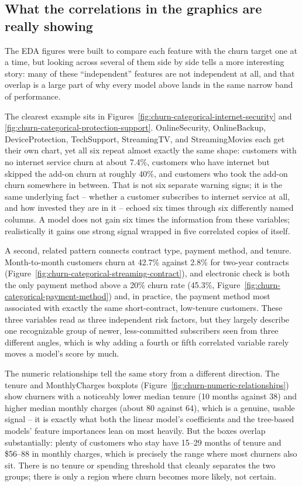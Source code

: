\documentclass{article}
\begin{document}
\subsection{What the correlations in the graphics are really showing}
The EDA figures were built to compare each feature with the churn target one at a time, but looking across several of them side by side tells a more interesting story: many of these ``independent'' features are not independent at all, and that overlap is a large part of why every model above lands in the same narrow band of performance.

The clearest example sits in Figures~\ref{fig:churn-categorical-internet-security} and \ref{fig:churn-categorical-protection-support}. OnlineSecurity, OnlineBackup, DeviceProtection, TechSupport, StreamingTV, and StreamingMovies each get their own chart, yet all six repeat almost exactly the same shape: customers with no internet service churn at about 7.4\%, customers who have internet but skipped the add-on churn at roughly 40\%, and customers who took the add-on churn somewhere in between. That is not six separate warning signs; it is the same underlying fact -- whether a customer subscribes to internet service at all, and how invested they are in it -- echoed six times through six differently named columns. A model does not gain six times the information from these variables; realistically it gains one strong signal wrapped in five correlated copies of itself.

A second, related pattern connects contract type, payment method, and tenure. Month-to-month customers churn at 42.7\% against 2.8\% for two-year contracts (Figure~\ref{fig:churn-categorical-streaming-contract}), and electronic check is both the only payment method above a 20\% churn rate (45.3\%, Figure~\ref{fig:churn-categorical-payment-method}) and, in practice, the payment method most associated with exactly the same short-contract, low-tenure customers. These three variables read as three independent risk factors, but they largely describe one recognizable group of newer, less-committed subscribers seen from three different angles, which is why adding a fourth or fifth correlated variable rarely moves a model's score by much.

The numeric relationships tell the same story from a different direction. The tenure and MonthlyCharges boxplots (Figure~\ref{fig:churn-numeric-relationships}) show churners with a noticeably lower median tenure (10 months against 38) and higher median monthly charges (about 80 against 64), which is a genuine, usable signal -- it is exactly what both the linear model's coefficients and the tree-based models' feature importances lean on most heavily. But the boxes overlap substantially: plenty of customers who stay have 15--29 months of tenure and \$56--88 in monthly charges, which is precisely the range where most churners also sit. There is no tenure or spending threshold that cleanly separates the two groups; there is only a region where churn becomes more likely, not certain.
\end{document}

